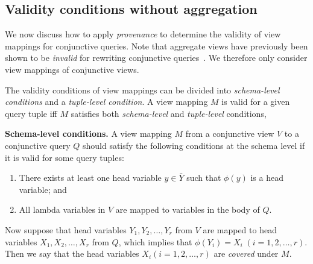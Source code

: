 \subsection{Validity conditions without aggregation}\label{valid_condition_no_agg}

We now discuss how to apply {\em provenance} to determine the validity of view mappings for conjunctive queries.
Note that aggregate views have previously been shown to be \textit{invalid} for rewriting conjunctive queries~\cite{srivastava1996answering}. We therefore only consider view mappings of conjunctive views.

The validity conditions of view mappings can be divided into {\em schema-level conditions} and a {\em tuple-level condition}. A view mapping $M$ is valid for a given query tuple iff $M$ satisfies both {\em schema-level} and {\em tuple-level} conditions,

\begin{definition}\label{definition:token mapping}
{\bf Schema-level conditions.}
A view mapping $M$ from a conjunctive view $V$ to a conjunctive query $Q$ should satisfy the following conditions at the schema level if it is valid for some query tuples:
\begin{enumerate}
\item There exists at least one head variable $y \in \bar{Y}$ such that $\phi(y)$ is a head variable; and
\item All lambda variables in $V$ are mapped to variables in the body of $Q$.
\end{enumerate}
\end{definition}

Now suppose that head variables $Y_1, Y_2, \dots, Y_r$ from $V$ are mapped to head variables $X_1, X_2, \dots, X_r$ from $Q$, which implies that $\phi(Y_i) = X_i \;(i=1,2,\dots, r)$. Then we say that the head variables $X_i (i=1,2,\dots, r)$ are {\em covered} under $M$.



